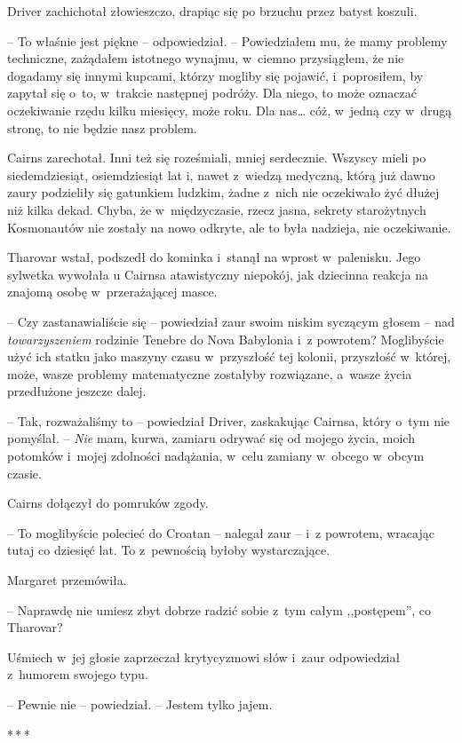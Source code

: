\documentclass[oneside,polish,12pt,sfheadings]{mwbk}
\newcommand{\threeast}{\bigskip\par\centerline{*\,*\,*}\medskip\par}%
\begin{document}
Driver zachichotał złowieszczo, drapiąc się po brzuchu przez batyst
koszuli.

-- To właśnie jest piękne -- odpowiedział. -- Powiedziałem mu, że mamy
problemy techniczne, zażądałem istotnego wynajmu, w~ciemno przysiągłem,
że nie dogadamy się innymi kupcami, którzy mogliby się pojawić, i~poprosiłem, by zapytał się o~to, w~trakcie następnej podróży. Dla niego,
to może oznaczać oczekiwanie rzędu kilku miesięcy, może roku. Dla nas\ldots
cóż, w~jedną czy w~drugą stronę, to nie będzie nasz problem.

Cairns zarechotał. Inni też się roześmiali, mniej serdecznie. Wszyscy
mieli po siedemdziesiąt, osiemdziesiąt lat i, nawet z~wiedzą medyczną,
którą już dawno zaury podzieliły się gatunkiem ludzkim, żadne z~nich nie
oczekiwało żyć dłużej niż kilka dekad. Chyba, że w~międzyczasie, rzecz
jasna, sekrety starożytnych Kosmonautów nie zostały na nowo odkryte, ale
to była nadzieja, nie oczekiwanie.

Tharovar wstał, podszedł do kominka i~stanął na wprost w~palenisku. Jego
sylwetka wywołała u Cairnsa atawistyczny niepokój, jak dziecinna reakcja
na znajomą osobę w~przerażającej masce.

-- Czy zastanawialiście się -- powiedział zaur swoim niskim syczącym
głosem -- nad \emph{towarzyszeniem} rodzinie Tenebre do Nova Babylonia i~z powrotem? Moglibyście użyć ich statku jako maszyny czasu w~przyszłość
tej kolonii, przyszłość w~której, może, wasze problemy matematyczne
zostałyby rozwiązane, a~wasze życia przedłużone jeszcze dalej.

-- Tak, rozważaliśmy to -- powiedział Driver, zaskakując Cairnsa, który o~tym nie pomyślał. -- \emph{Nie }mam, kurwa, zamiaru odrywać się od mojego
życia, moich potomków i~mojej zdolności nadążania, w~celu zamiany w~obcego w~obcym czasie.

Cairns dołączył do pomruków zgody.

-- To moglibyście polecieć do Croatan -- nalegał zaur -- i~z powrotem,
wracając tutaj co dziesięć lat. To z~pewnością byłoby wystarczające.

Margaret przemówiła. 

-- Naprawdę nie umiesz zbyt dobrze radzić sobie z~tym całym ,,postępem'', co Tharovar?

Uśmiech w~jej głosie zaprzeczał krytycyzmowi słów i~zaur odpowiedział z~humorem swojego typu.

-- Pewnie nie -- powiedział. -- Jestem tylko jajem.

\threeast
\end{document}
